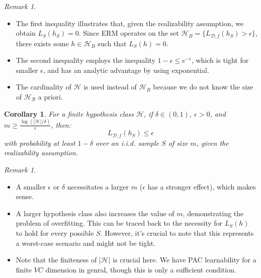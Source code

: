 \documentclass{article}
\newtheorem{corollary}[theorem]{Corollary}
\theoremstyle{remark}
\newtheorem{remark}[example]{Remark}
\begin{document}
\begin{remark}
\begin{itemize}
\item The first inequality illustrates that, given the realizability assumption, we obtain $L_S(h_S) = 0$. Since ERM operates on the set $\mathcal{H}_B=\{L_{\mathcal{D}, f}(h_S)>\epsilon\}$, there exists some $h\in \mathcal{H}_B$ such that $L_S(h) = 0$.
\item The second inequality employs the inequality $1-\epsilon \leq e^{-\epsilon}$, which is tight for smaller $\epsilon$, and has an analytic advantage by using exponential.
\item The cardinality of $\mathcal{H}$ is used instead of $\mathcal{H}_B$ because we do not know the size of $\mathcal{H_B}$ a priori.
\end{itemize}
\end{remark}

\begin{corollary}
For a finite hypothesis class $\mathcal{H}$, if $\delta\in (0,1)$, $\epsilon > 0$, and $m \geq \frac{\log(\lvert\mathcal{H}\rvert/\delta)}{\epsilon}$, then:
\[L_{\mathcal{D}, f}(h_S) \leq \epsilon\]
with probability at least $1-\delta$ over an i.i.d. sample $S$ of size $m$, given the realizability assumption.
\end{corollary}

\begin{remark}
\begin{itemize}
\item A smaller $\epsilon$ or $\delta$ necessitates a larger $m$ ($\epsilon$ has a stronger effect), which makes sense.
\item A larger hypothesis class also increases the value of $m$, demonstrating the problem of overfitting. This can be traced back to the necessity for $L_S(h)$ to hold for every possible $S$. However, it's crucial to note that this represents a worst-case scenario and might not be tight.
\item Note that the finiteness of $\lvert \mathcal{H}\rvert$ is crucial here. We have PAC learnability for a finite $VC$ dimension in genral, though this is only a sufficient condition.
\end{itemize}
\end{remark}
\end{document}
